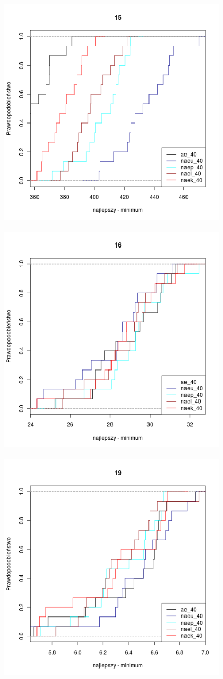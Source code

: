\documentclass[12pt, a4paper]{article}
\begin{document}
\begin{figure}[H]
\centering
\mbox{
  {\includegraphics[width=.35\textwidth]{../pngs/40/15.png} }
  {\includegraphics[width=.35\textwidth]{../pngs/40/16.png} }
  {\includegraphics[width=.35\textwidth]{../pngs/40/19.png} }}
\end{figure}
\end{document}
